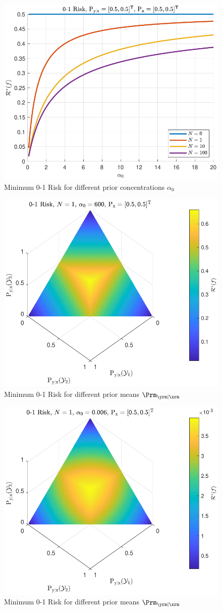 \documentclass[12pt]{report}
\begin{document}
\begin{figure}
\centering
\includegraphics[width=0.7\linewidth]{Risk_01_Dir_a0_leg_N.pdf}
\caption{Minimum 0-1 Risk for different prior concentrations $\alpha_0$}
\label{fig:Risk_01_Dir_a0_leg_N}
\end{figure}

\begin{figure}
\centering
\includegraphics[width=0.7\linewidth]{Risk_01_Dir_Pyx__a0_high.pdf}
\caption{Minimum 0-1 Risk for different prior means $\Prm_{\yrm | \xrm}$}
\label{fig:Risk_01_Dir_Pyx__a0_high}
\end{figure}

\begin{figure}
\centering
\includegraphics[width=0.7\linewidth]{Risk_01_Dir_Pyx__a0_low.pdf}
\caption{Minimum 0-1 Risk for different prior means $\Prm_{\yrm | \xrm}$}
\label{fig:Risk_01_Dir_Pyx__a0_low}
\end{figure}
\end{document}
